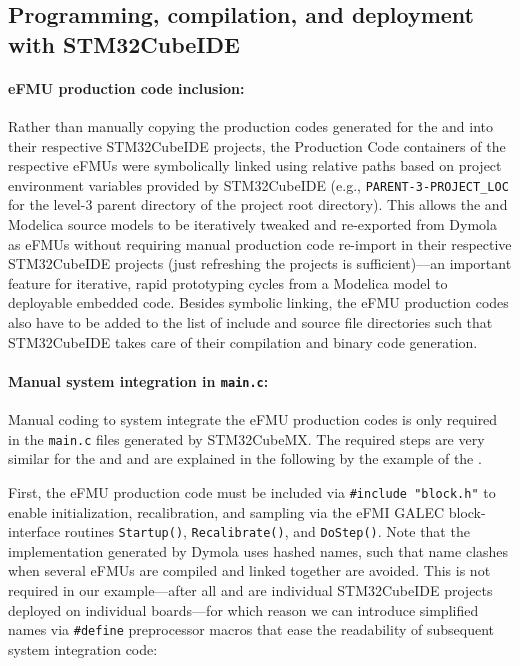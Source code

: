 \subsection{Programming, compilation, and deployment with STM32CubeIDE}\label{sec:STM32CubeIDE}

\paragraph{eFMU production code inclusion:} Rather than manually copying the production codes generated for the \controller{} and \plant{} into their respective STM32CubeIDE projects, the Production Code containers of the respective eFMUs were symbolically linked using relative paths based on project environment variables provided by STM32CubeIDE (e.g., \texttt{PARENT-3-PROJECT\_LOC} for the level-3 parent directory of the project root directory). This allows the \controller{} and \plant{} Modelica source models to be iteratively tweaked and re-exported from Dymola as eFMUs without requiring manual production code re-import in their respective STM32CubeIDE projects (just refreshing the projects is sufficient)---an important feature for iterative, rapid prototyping cycles from a Modelica model to deployable embedded code. Besides symbolic linking, the eFMU production codes also have to be added to the list of include and source file directories such that STM32CubeIDE takes care of their compilation and binary code generation.

\paragraph{Manual system integration in \texttt{main.c}:}\label{sec:stm32-system-integration-main-loop}

Manual coding to system integrate the eFMU production codes is only required in the \texttt{main.c} files generated by STM32CubeMX. The required steps are very similar for the \controller{} and \plant{} and are explained in the following by the example of the \controller{}.

First, the eFMU production code must be included via \texttt{\#include "block.h"} to enable \controller{} initialization, recalibration, and sampling via the eFMI GALEC block-interface routines \texttt{Startup()}, \texttt{Recalibrate()}, and \texttt{DoStep()}. Note that the implementation generated by Dymola uses hashed names, such that name clashes when several eFMUs are compiled and linked together are avoided. This is not required in our example---after all \controller{} and \plant{} are individual STM32CubeIDE projects deployed on individual boards---for which reason we can introduce simplified names via \texttt{\#define} preprocessor macros that ease the readability of subsequent system integration code:

